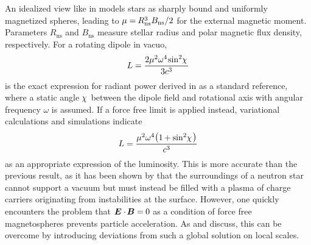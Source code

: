 An idealized view like in \cite{Deutsch_1955} models stars as sharply bound and uniformly magnetized spheres, leading to
$\cramped{\mu \kern-0.1pt = \kern-0.6pt R_\text{ns}^3 B_\text{ns} \kern+0.1pt / 2}$ for the external magnetic moment.
Parameters $R_\text{ns}$ and $B_\text{ns}$ measure stellar radius and polar magnetic flux density, respectively. For a rotating
dipole in vacuo,
\begin{equation}
	L = \frac{2\mu^2 \omega^4 \kern-1.0pt \sin^2 \kern-2.0pt \chi \kern+1.0pt}{3c^3}
	\label{eqn:vacuum}
\end{equation}
is the exact expression for radiant power derived in \cite{Jackson_1999} as a standard reference, where a static angle
$\kern-1.0pt \chi \kern+1.0pt$ between the dipole field and rotational axis with angular frequency $\omega$ is assumed. If
a force free limit is applied instead, variational calculations \cite{Gruzinov_2006} and simulations \cite{Spitkovsky_2006} indicate
\begin{equation}
	L = \frac{\mu^2 \omega^4 \raisebox{0.15ex}{\( \bigl(
	\raisebox{-0.15ex}{\( 1 \kern-0.7pt + \sin^2 \kern-2.0pt \chi \kern+1.0pt \)} \bigr) \)} }{c^3}
	\label{eqn:ffe-mhd}
\end{equation}
as an appropriate expression of the luminosity. This is more accurate than the previous result, as it has been
shown by \cite{Goldreich_1969} that the surroundings of a neutron star cannot support a vacuum but must instead be filled with a
plasma of charge carriers originating from instabilities at the surface. However, one quickly encounters the problem that
$\bm{E} \cdot \kern-1.0pt \bm{B} = \kern-0.5pt 0$ as a condition of force free magnetospheres prevents particle acceleration. As
\cite{Li_2012} and \cite{Gralla_2019} discuss, this can be overcome by introducing deviations from such a global solution on local
scales.

